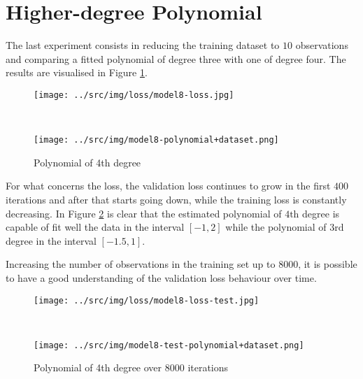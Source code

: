 \documentclass[a4paper,12pt]{article} %
\begin{document}
	
	\section{Higher-degree Polynomial}
	The last experiment consists in reducing the training dataset to $10$ 
	observations and comparing a fitted polynomial of degree three with 
	one of degree four.
	The results are visualised in Figure \ref*{fig:model8}.
	
	\begin{figure}[H]
		\begin{minipage}[c]{.49\textwidth}
			\centering
			\texttt{[image: ../src/img/loss/model8-loss.jpg]}
		\end{minipage}
		~
		\begin{minipage}[c]{.49\textwidth}
			\centering
			\texttt{[image: ../src/img/model8-polynomial+dataset.png]}
		\end{minipage}
	\caption{Polynomial of 4th degree}
	\label{fig:model8}
	\end{figure}

	For what concerns the loss, the validation loss continues to grow in the 
	first $400$ iterations and after that starts going down, while the 
	training loss is constantly decreasing.
	In Figure \ref*{fig:model8-test} is clear that the estimated 
	polynomial of $4\mathrm{th}$ degree is capable of fit well the data in 
	the interval $[-1,2]$ while the polynomial of $3\mathrm{rd}$ degree 
	in the interval $[-1.5,1]$.\bigskip
	
	Increasing the number of observations in the training set up to $8000$, it 
	is possible to have a good understanding of the validation loss behaviour 
	over time. 
	
	\begin{figure}[H]
		\begin{minipage}[c]{.49\textwidth}
			\centering
			\texttt{[image: ../src/img/loss/model8-loss-test.jpg]}
		\end{minipage}
		~
		\begin{minipage}[c]{.49\textwidth}
			\centering
			\texttt{[image: ../src/img/model8-test-polynomial+dataset.png]}
		\end{minipage}
	\caption{Polynomial of 4th degree over $8000$ iterations}
	\label{fig:model8-test}
	\end{figure}
\end{document}
